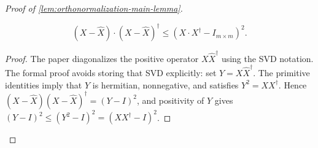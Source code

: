 \begin{proof}[Proof of \ref{lem:orthonormalization-main-lemma}]
	\begin{lemma}\label{lem:squared-difference}
		\leanok
		\begin{equation*}
			(X - \widehat{X}) \cdot (X - \widehat{X})^\dagger \leq (X \cdot X^\dagger - I_{m \times m})^2.
		\end{equation*}
	\end{lemma}
	\begin{proof}
		\leanok
		The paper diagonalizes the positive operator $X\widehat X^\dagger$ using the
		SVD notation.  The formal proof avoids storing that SVD explicitly: set
		$Y=X\widehat X^\dagger$.  The primitive identities imply that $Y$ is
		hermitian, nonnegative, and satisfies $Y^2=XX^\dagger$.  Hence
		$(X-\widehat X)(X-\widehat X)^\dagger=(Y-I)^2$, and positivity of $Y$ gives
		$(Y-I)^2\leq(Y^2-I)^2=(XX^\dagger-I)^2$.
	\end{proof}


\end{proof}
